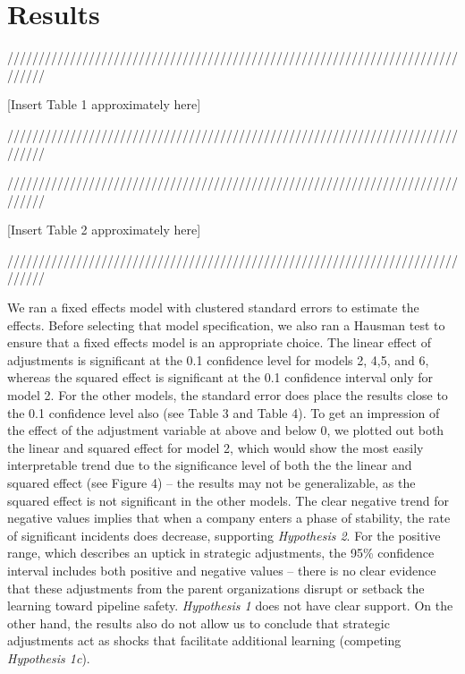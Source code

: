 \section{Results}

{\centering
	//////////////////////////////////////////////////////////////////////////////
	
	[Insert Table 1 approximately here]
	
	//////////////////////////////////////////////////////////////////////////////\par
}

\begin{table}
	\caption{}
\end{table}

{\centering
	//////////////////////////////////////////////////////////////////////////////
	
	[Insert Table 2 approximately here]
	
	//////////////////////////////////////////////////////////////////////////////\par
}

\begin{table}
	\caption{}
\end{table}

We ran a fixed effects model with clustered standard errors to estimate the effects. Before selecting that model specification, we also ran a Hausman test to ensure that a fixed effects model is an appropriate choice. The linear effect of adjustments is significant at the 0.1 confidence level for models 2, 4,5, and 6, whereas the squared effect is significant at the 0.1 confidence interval only for model 2. For the other models, the standard error does place the results close to the 0.1 confidence level also (see Table 3 and Table 4). To get an impression of the effect of the adjustment variable at above and below 0, we plotted out both the linear and squared effect for model 2, which would show the most easily interpretable trend due to the significance level of both the the linear and squared effect (see Figure 4) -- the results may not be generalizable, as the squared effect is not significant in the other models. The clear negative trend for negative values implies that when a company enters a phase of stability, the rate of significant incidents does decrease, supporting \textit{Hypothesis 2}. For the positive range, which describes an uptick in strategic adjustments, the 95\% confidence interval includes both positive and negative values -- there is no clear evidence that these adjustments from the parent organizations disrupt or setback the learning toward pipeline safety. \textit{Hypothesis 1} does not have clear support. On the other hand, the results also do not allow us to conclude that strategic adjustments act as shocks that facilitate additional learning (competing \textit{Hypothesis 1c}).

